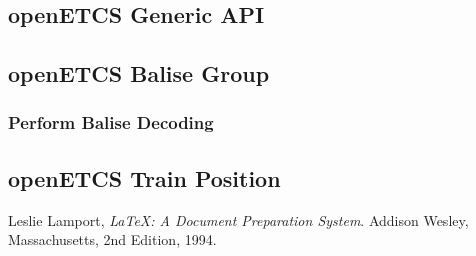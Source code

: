 \documentclass{template/openetcs_article}
\begin{document}


\subsection{openETCS Generic API}



\subsection{openETCS Balise Group}



\subsubsection{Perform Balise Decoding}
\subsection{openETCS Train Position}




\nocite{*}






\begin{thebibliography}{9}

  Leslie Lamport,
  \emph{\LaTeX: A Document Preparation System}.
  Addison Wesley, Massachusetts,
  2nd Edition,
  1994.

\end{thebibliography}

\end{document}

